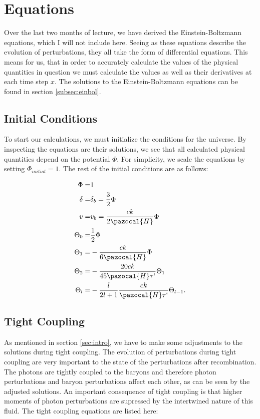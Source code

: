 \documentclass[a4paper]{article}
\begin{document}
\clearpage

\section{Equations}\label{sec:label}
Over the last two months of lecture, we have derived the Einstein-Boltzmann equations, which I will not include here. Seeing as these equations describe the evolution of perturbations, they all take the form of differential equations. This means for us, that in order to accurately calculate the values of the physical quantities in question we must calculate the values as well as their derivatives at each time step $x$. The solutions to the Einstein-Boltzmann equations can be found in section \ref{subsec:einbol}.

\subsection{Initial Conditions}\label{subsec:init}
To start our calculations, we must initialize the conditions for the universe. By inspecting the equations are their solutions, we see that all calculated physical quantities depend on the potential $\Phi$. For simplicity, we scale the equations by setting $\Phi_{initial} = 1$. The rest of the initial conditions are as follows:

\begin{align}
\Phi =& 1 \\
\delta =& \delta_b = \dfrac{3}{2}\Phi \\
v =& v_b = \dfrac{ck}{2\pazocal{H}} \Phi \\
\Theta_0 =& \dfrac{1}{2} \Phi \\
\Theta_1 =& -\dfrac{ck}{6\pazocal{H}} \Phi \\
\Theta_2 =& - \dfrac{20ck}{45\pazocal{H}\tau`} \Theta_1 \\
\Theta_l =& - \dfrac{l}{2l+1}\dfrac{ck}{\pazocal{H}\tau`} \Theta_{l-1}.
\end{align}


\subsection{Tight Coupling}\label{subsec:tight}

As mentioned in section \ref{sec:intro}, we have to make some adjustments to the solutions during tight coupling. The evolution of perturbations during tight coupling are very important to the state of the perturbations after recombination. The photons are tightly coupled to the baryons and therefore photon perturbations and baryon perturbations affect each other, as can be seen by the adjusted solutions. An important consequence of tight coupling is that higher moments of photon perturbations are supressed by the intertwined nature of this fluid. The tight coupling equations are listed here:
\end{document}
